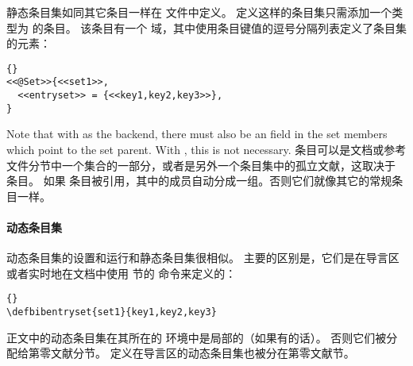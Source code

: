 静态条目集如同其它条目一样在  文件中定义。
定义这样的条目集只需添加一个类型为  的条目。
该条目有一个  域，其中使用条目键值的逗号分隔列表定义了条目集的元素：

\begin{lstlisting}[style=bibtex]{}
<<@Set>>{<<set1>>,
  <<entryset>> = {<<key1,key2,key3>>},
}
\end{lstlisting}
%

Note that with \bibtex as the backend, there must also be an  field in the set members which point to the set parent. With \biber, this is not necessary.
条目可以是文档或参考文件分节中一个集合的一部分，或者是另外一个条目集中的孤立文献，这取决于  条目。
如果  条目被引用，其中的成员自动分成一组。否则它们就像其它的常规条目一样。

\paragraph[动态条目集]{动态条目集}


动态条目集的设置和运行和静态条目集很相似。
主要的区别是，它们是在导言区或者实时地在文档中使用  节的  命令来定义的：

\begin{lstlisting}[style=bibtex]{}
\defbibentryset{set1}{key1,key2,key3}
\end{lstlisting}
%
正文中的动态条目集在其所在的  环境中是局部的（如果有的话）。
否则它们被分配给第零文献分节。
定义在导言区的动态条目集也被分在第零文献节。

